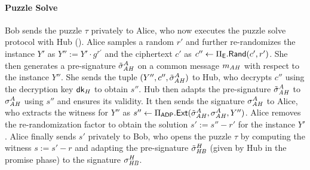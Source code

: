 

\paragraph{Puzzle Solve}
Bob sends the puzzle $\tau$ privately to Alice, who now executes the puzzle solve protocol with Hub 
().
Alice samples a random $r'$ and further re-randomizes the instance $Y'$ as $Y'' := Y' \cdot g^{r'}$ and the ciphertext $c'$ as $c'' \gets \Pi_{\mathsf{E}}.\mathsf{Rand}(c', r')$. 
She then generates a pre-signature $\tilde{\sigma}_{\mathit{AH}}^A$ on a common message $m_{\mathit{AH}}$ with respect to the instance $Y''$. She sends the tuple $(Y'', c'', \tilde{\sigma}_{\mathit{AH}}^A)$ to Hub, who decrypts $c''$ using the decryption key $\mathsf{dk}_H$ to obtain $s''$. 
Hub then adapts the pre-signature $\tilde{\sigma}_{\mathit{AH}}^A$ to $ \sigma_{\mathit{AH}}^A$ using $s''$ and ensures its validity. It then sends the signature $\sigma_{\mathit{AH}}^A$ to Alice, who extracts the witness for $Y''$ as $ s'' \gets \Pi_{\mathsf{ADP}}.{\mathsf{Ext}}(\tilde{\sigma}_{\mathit{AH}}^A, \sigma_{\mathit{AH}}^A, Y'')$. 
Alice removes the re-randomization factor to obtain the solution $s' := s'' - r'$ for the instance $Y'$. Alice finally sends $s'$ privately to Bob, who opens the puzzle $\tau$ by computing the witness $s := s' - r$ and adapting the pre-signature $\tilde{\sigma}_{\mathit{HB}}^H$ (given by Hub in the promise phase) to the signature $\sigma_{\mathit{HB}}^H$.


